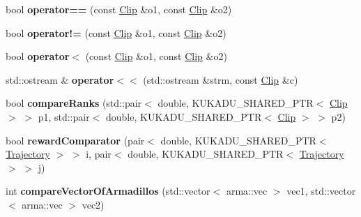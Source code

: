 \begin{DoxyCompactItemize}
\item 
\hypertarget{namespacekukadu_ac6e6b9fba33fff6363495dd91f0dc2e3}{bool {\bfseries operator==} (const \hyperlink{classkukadu_1_1Clip}{Clip} \&o1, const \hyperlink{classkukadu_1_1Clip}{Clip} \&o2)}\label{namespacekukadu_ac6e6b9fba33fff6363495dd91f0dc2e3}

\item 
\hypertarget{namespacekukadu_aa0c29fe932bb4fab8615a7fc1e709a4e}{bool {\bfseries operator!=} (const \hyperlink{classkukadu_1_1Clip}{Clip} \&o1, const \hyperlink{classkukadu_1_1Clip}{Clip} \&o2)}\label{namespacekukadu_aa0c29fe932bb4fab8615a7fc1e709a4e}

\item 
\hypertarget{namespacekukadu_a2144e04f1c0705a360cd6149f0ee0bda}{bool {\bfseries operator$<$} (const \hyperlink{classkukadu_1_1Clip}{Clip} \&o1, const \hyperlink{classkukadu_1_1Clip}{Clip} \&o2)}\label{namespacekukadu_a2144e04f1c0705a360cd6149f0ee0bda}

\item 
\hypertarget{namespacekukadu_a6094d0956675a7442f632511e3c225c2}{std\-::ostream \& {\bfseries operator$<$$<$} (std\-::ostream \&strm, const \hyperlink{classkukadu_1_1Clip}{Clip} \&c)}\label{namespacekukadu_a6094d0956675a7442f632511e3c225c2}

\item 
\hypertarget{namespacekukadu_a13f6dc9a722ad4e8f9423b09c5f8891f}{bool {\bfseries compare\-Ranks} (std\-::pair$<$ double, K\-U\-K\-A\-D\-U\-\_\-\-S\-H\-A\-R\-E\-D\-\_\-\-P\-T\-R$<$ \hyperlink{classkukadu_1_1Clip}{Clip} $>$ $>$ p1, std\-::pair$<$ double, K\-U\-K\-A\-D\-U\-\_\-\-S\-H\-A\-R\-E\-D\-\_\-\-P\-T\-R$<$ \hyperlink{classkukadu_1_1Clip}{Clip} $>$ $>$ p2)}\label{namespacekukadu_a13f6dc9a722ad4e8f9423b09c5f8891f}

\item 
\hypertarget{namespacekukadu_a769850a7867642cb26d5f596da1641db}{bool {\bfseries reward\-Comparator} (pair$<$ double, K\-U\-K\-A\-D\-U\-\_\-\-S\-H\-A\-R\-E\-D\-\_\-\-P\-T\-R$<$ \hyperlink{classkukadu_1_1Trajectory}{Trajectory} $>$ $>$ i, pair$<$ double, K\-U\-K\-A\-D\-U\-\_\-\-S\-H\-A\-R\-E\-D\-\_\-\-P\-T\-R$<$ \hyperlink{classkukadu_1_1Trajectory}{Trajectory} $>$ $>$ j)}\label{namespacekukadu_a769850a7867642cb26d5f596da1641db}

\item 
\hypertarget{namespacekukadu_a432d51adba03ad970dc0a3d07bbff718}{int {\bfseries compare\-Vector\-Of\-Armadillos} (std\-::vector$<$ arma\-::vec $>$ vec1, std\-::vector$<$ arma\-::vec $>$ vec2)}\label{namespacekukadu_a432d51adba03ad970dc0a3d07bbff718}


\end{DoxyCompactItemize}

